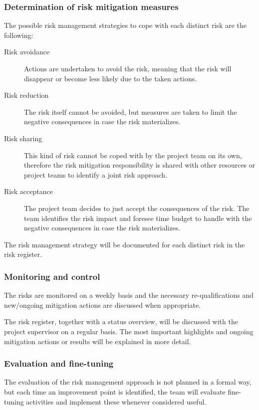 \subsubsection{Determination of risk mitigation measures}
The possible risk management strategies to cope with each distinct risk are the following:
\begin{description}
	\item [Risk avoidance]
	Actions are undertaken to avoid the risk, meaning that the risk will disappear or become less likely due to the taken actions.
	\item[Risk reduction]
	The risk itself cannot be avoided, but measures are taken to limit the negative consequences in case the risk materializes.
	\item[Risk sharing]
	This kind of risk cannot be coped with by the project team on its own, therefore the risk mitigation responsibility is shared with other resources or project teams to identify a joint risk approach.
	\item[Risk acceptance]
	The project team decides to just accept the consequences of the risk.
	The team identifies the risk impact and foresee time budget to handle with the negative consequences in case the risk materializes.
\end {description}

\noindent
The risk management strategy will be documented for each distinct risk in the risk register.

\subsubsection{Monitoring and control}
The risks are monitored on a weekly basis and the necessary re-qualifications and new/ongoing mitigation actions are discussed when appropriate.

The risk register, together with a status overview, will be discussed with the project supervisor on a regular basis.
The most important highlights and ongoing mitigation actions or results will be explained in more detail.

\subsubsection{Evaluation and fine-tuning}
The evaluation of the risk management approach is not planned in a formal way, but each time an improvement point is identified, the team will evaluate fine-tuning activities and implement these whenever considered useful.

